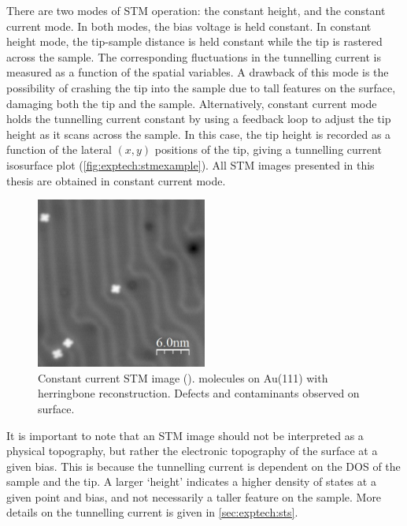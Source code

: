 There are two modes of \ac{STM} operation: the constant height, and the constant current mode. In both modes, the bias voltage is held constant. In constant height mode, the tip-sample distance is held constant while the tip is rastered across the sample. The corresponding fluctuations in the tunnelling current is measured as a function of the spatial variables. A drawback of this mode is the possibility of crashing the tip into the sample due to tall features on the surface, damaging both the tip and the sample. Alternatively, constant current mode holds the tunnelling current constant by using a feedback loop to adjust the tip height as it scans across the sample. In this case, the tip height is recorded as a function of the lateral $(x,y)$ positions of the tip, giving a tunnelling current isosurface plot (\autoref{fig:exptech:stmexample}). All \ac{STM} images presented in this thesis are obtained in constant current mode.

\begin{figure} [h]
    \centering
    \includegraphics[width=0.5\textwidth]{pictures/f8znpc_au111_-2p5V_2pA.jpg}
    \caption{Constant current STM image ().  molecules on Au(111) with herringbone reconstruction. Defects and contaminants observed on surface.}
    \label{fig:exptech:stmexample}
\end{figure}

It is important to note that an \ac{STM} image should not be interpreted as a physical topography, but rather the electronic topography of the surface at a given bias. This is because the tunnelling current is dependent on the \ac{DOS} of the sample and the tip. A larger `height' indicates a higher density of states at a given point and bias, and not necessarily a taller feature on the sample. More details on the tunnelling current is given in \autoref{sec:exptech:sts}.




